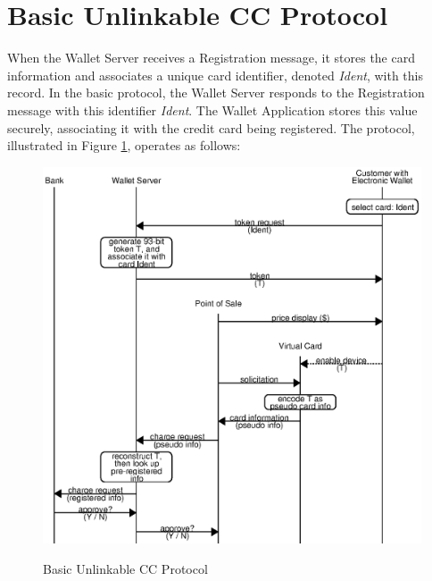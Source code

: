 \section{Basic Unlinkable CC Protocol}
\label{sec:unlinkable-design-1}

When the Wallet Server receives a Registration message,
    it stores the card information and associates a unique card identifier, denoted \emph{Ident}, with this record.
In the basic protocol, the Wallet Server responds to the Registration message with this identifier \emph{Ident}.
The Wallet Application stores this value securely, associating it with the credit card being registered.
The protocol, illustrated in Figure \ref{fig:unlinkable-1}, operates as follows:

\begin{figure}[h!]
  \caption{Basic Unlinkable CC Protocol}
  \centering
    \includegraphics{img/unlinkable-1.eps}
  \label{fig:unlinkable-1}
\end{figure}

